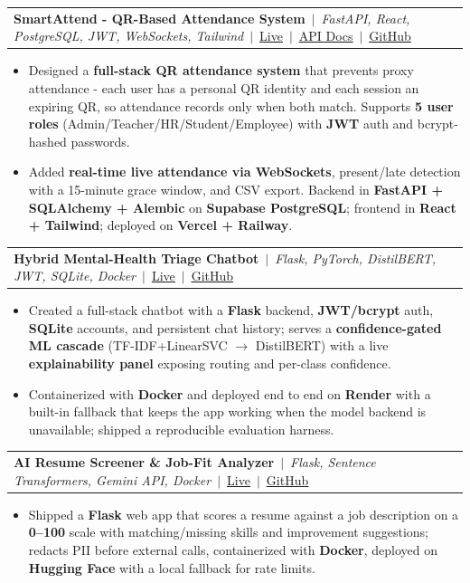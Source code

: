 \documentclass[letterpaper,9pt]{article}
\makeatletter
\newcommand{\resumeItem}[1]{%
  \item\scriptsize{#1}%
}
\newcommand{\resumeProjectHeading}[1]{%
  \vspace{0pt}\item
  \begin{tabular*}{1.0\textwidth}{l@{\extracolsep{\fill}}r}
    \scriptsize #1\\
  \end{tabular*}\vspace{-3pt}%
}
\newcommand{\resumeItemListStart}{\begin{itemize}[leftmargin=0.15in,itemsep=1pt,topsep=1pt,parsep=0pt]}
\newcommand{\resumeItemListEnd}{\end{itemize}\vspace{0pt}}
\makeatother
\begin{document}
  \resumeProjectHeading
    {\textbf{SmartAttend - QR-Based Attendance System}~$|$~\emph{FastAPI, React, PostgreSQL, JWT, WebSockets, Tailwind}~$|$~\href{https://smart-attend-beryl.vercel.app}{\underline{Live}}~$|$~\href{https://smartattend-api-production-9bd4.up.railway.app/docs}{\underline{API Docs}}~$|$~\href{https://github.com/afrin2315/smart_attend}{\underline{GitHub}}}
  \resumeItemListStart
    \resumeItem{Designed a \textbf{full-stack QR attendance system} that prevents proxy attendance - each user has a personal QR identity and each session an expiring QR, so attendance records only when both match. Supports \textbf{5 user roles} (Admin/Teacher/HR/Student/Employee) with \textbf{JWT} auth and bcrypt-hashed passwords.}
    \resumeItem{Added \textbf{real-time live attendance via WebSockets}, present/late detection with a 15-minute grace window, and CSV export. Backend in \textbf{FastAPI + SQLAlchemy + Alembic} on \textbf{Supabase PostgreSQL}; frontend in \textbf{React + Tailwind}; deployed on \textbf{Vercel + Railway}.}
  \resumeItemListEnd

  \resumeProjectHeading
    {\textbf{Hybrid Mental-Health Triage Chatbot}~$|$~\emph{Flask, PyTorch, DistilBERT, JWT, SQLite, Docker}~$|$~\href{https://hybrid-chatbot-o0s2.onrender.com}{\underline{Live}}~$|$~\href{https://github.com/afrin2315/hybrid_chatbot}{\underline{GitHub}}}
  \resumeItemListStart
    \resumeItem{Created a full-stack chatbot with a \textbf{Flask} backend, \textbf{JWT/bcrypt} auth, \textbf{SQLite} accounts, and persistent chat history; serves a \textbf{confidence-gated ML cascade} (TF-IDF+LinearSVC $\rightarrow$ DistilBERT) with a live \textbf{explainability panel} exposing routing and per-class confidence.}
    \resumeItem{Containerized with \textbf{Docker} and deployed end to end on \textbf{Render} with a built-in fallback that keeps the app working when the model backend is unavailable; shipped a reproducible evaluation harness.}
  \resumeItemListEnd

  \resumeProjectHeading
    {\textbf{AI Resume Screener \& Job-Fit Analyzer}~$|$~\emph{Flask, Sentence Transformers, Gemini API, Docker}~$|$~\href{https://huggingface.co/spaces/Afrin18/ai-resume-screener}{\underline{Live}}~$|$~\href{https://github.com/afrin2315/ai-resume-screener}{\underline{GitHub}}}
  \resumeItemListStart
    \resumeItem{Shipped a \textbf{Flask} web app that scores a resume against a job description on a \textbf{0--100} scale with matching/missing skills and improvement suggestions; redacts PII before external calls, containerized with \textbf{Docker}, deployed on \textbf{Hugging Face} with a local fallback for rate limits.}
  \resumeItemListEnd
\end{document}
